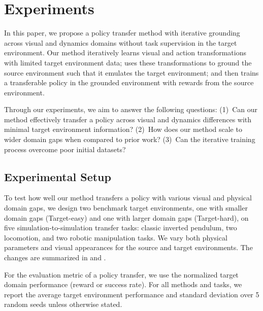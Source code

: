 \section{Experiments}

In this paper, we propose a policy transfer method with iterative grounding across visual and dynamics domains without task supervision in the target environment. Our method iteratively learns visual and action transformations with limited target environment data; uses these transformations to ground the source environment such that it emulates the target environment; and then trains a transferable policy in the grounded environment with rewards from the source environment.

Through our experiments, we aim to answer the following questions: (1)~Can our method effectively transfer a policy across visual and dynamics differences with minimal target environment information? (2)~How does our method scale to wider domain gaps when compared to prior work?  (3)~Can the iterative training process overcome poor initial datasets?


\subsection{Experimental Setup}

To test how well our method transfers a policy with various visual and physical domain gaps, we design two benchmark target environments, one with smaller domain gaps (Target-easy) and one with larger domain gaps (Target-hard), on five simulation-to-simulation transfer tasks: classic inverted pendulum, two locomotion, and two robotic manipulation tasks. We vary both physical parameters and visual appearances for the source and target environments.  The changes are summarized in  and .  

For the evaluation metric of a policy transfer, we use the normalized target domain performance (reward or success rate).  For all methods and tasks, we report the average target environment performance and standard deviation over 5 random seeds unless otherwise stated.



